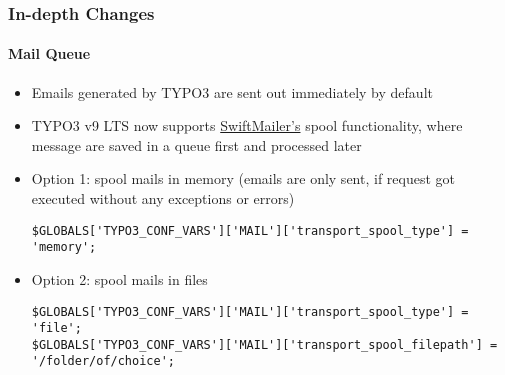 
\begin{frame}[fragile]
	\frametitle{In-depth Changes}
	\framesubtitle{Mail Queue}

	\lstset{basicstyle=\tiny\ttfamily}

	\begin{itemize}
		\item Emails generated by TYPO3 are sent out immediately by default
		\item TYPO3 v9 LTS now supports
			\href{https://swiftmailer.symfony.com/}{SwiftMailer's} spool functionality,
			where message are saved in a queue first and processed later

		\item Option 1: spool mails in memory\newline
			\smaller
				(emails are only sent, if request got executed without any exceptions or errors)
			\normalsize

\begin{lstlisting}
$GLOBALS['TYPO3_CONF_VARS']['MAIL']['transport_spool_type'] = 'memory';
\end{lstlisting}

		\item Option 2: spool mails in files

\begin{lstlisting}
$GLOBALS['TYPO3_CONF_VARS']['MAIL']['transport_spool_type'] = 'file';
$GLOBALS['TYPO3_CONF_VARS']['MAIL']['transport_spool_filepath'] = '/folder/of/choice';
\end{lstlisting}

	\end{itemize}

\end{frame}


